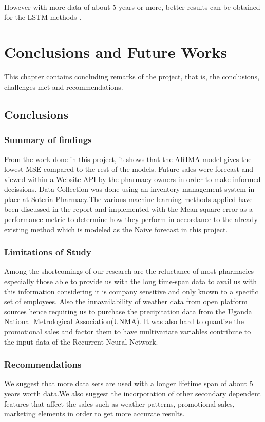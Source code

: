 \documentclass[12pt]{report}
\begin{document}
However with more data of about 5 years or more, better results can be obtained for the LSTM methods .


\chapter{Conclusions and Future Works}
This chapter contains concluding remarks of the project, that is, the conclusions, challenges met and recommendations.


\section{Conclusions}

\subsection{Summary of findings}
From the work done in this project, it shows that the ARIMA model gives the lowest MSE compared to the rest of the models.
Future sales were  forecast and viewed within a Website API by the pharmacy owners in order to make informed decissions.
Data Collection was done using an inventory management system in place at Soteria Pharmacy.The various machine learning methods applied have been discussed in the report and implemented with the Mean square error as a performance metric to determine how they perform in accordance to the already existing method which is modeled as the Naive forecast in this project.


\subsection{Limitations of Study}
Among the shortcomings of our research are the reluctance of most pharmacies especially those able to provide us with the long time-span data to avail us with this information considering it is company sensitive and only known to a specific set of employees.
Also the innavailability of weather data from open platform sources hence requiring us to purchase the precipitation data from the Uganda National Metrological Association(UNMA).
It was also hard to quantize the promotional sales and factor them to have multivariate variables contribute to the input data of the Recurrent Neural Network.

\subsection{Recommendations}
We suggest that more data sets are used with a longer lifetime span of about 5 years worth data.We also suggest the incorporation of other secondary dependent features that affect the sales such as weather patterns, promotional sales, marketing elements in order to get more accurate results. 
\end{document}
